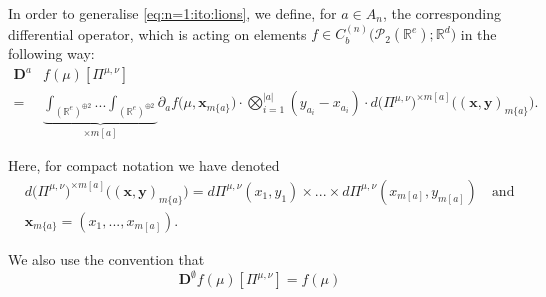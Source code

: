 \documentclass[a4paper,11pt,twoside]{article}
\numberwithin{equation}{section}
\theoremstyle{plain}
\newcommand{\bR}{\mathbb{R}}
\newcommand{\cP}{\mathcal{P}}
\newcommand{\rD}{\mathbf{D}}
\newcommand{\1}{\mathbbm{1}}
\begin{document}
	In order to generalise \eqref{eq:n=1:ito:lions}, we define, for $a\in A_n$,
	the corresponding differential operator, which is acting on elements $f \in C_b^{(n)}\big( \cP_2(\bR^e); \bR^d \big)$ in the following way:
	\begin{align}
		\nonumber
		\rD^a &f(\mu)[\Pi^{\mu, \nu}] 
		\\
		\label{eq:D^a:without:0}
		=& \underbrace{\int_{(\bR^e)^{\oplus 2}} ... \int_{(\bR^e)^{\oplus 2}} }_{\times m[a]} \partial_a f\Big( \mu, \boldsymbol{x}_{m\{a\}} \Big) \cdot \bigotimes_{i=1}^{|a|} ( y_{a_i} - x_{a_i}) \cdot d\big( \Pi^{\mu, \nu}\big)^{\times m[a]} \Big( (\boldsymbol{x}, \boldsymbol{y})_{m\{a\}}\Big) . 
	\end{align}
	
	Here, for compact notation we have denoted
	\begin{align*}
		&d\big( \Pi^{\mu, \nu}\big)^{\times m[a]} \Big( (\boldsymbol{x}, \boldsymbol{y})_{m\{a\}}\Big) = d\Pi^{\mu, \nu}(x_1, y_1) \times ... \times d\Pi^{\mu, \nu}(x_{m[a]}, y_{m[a]} ) \quad \mbox{and}
		\\
		& \boldsymbol{x}_{m\{a\}} = (x_1, ..., x_{m[a]}). 
	\end{align*}
	
	We also use the convention that
	$$
	\rD^{\emptyset} f(\mu)[\Pi^{\mu, \nu}]	= f(\mu)
	$$
	
\end{document}
